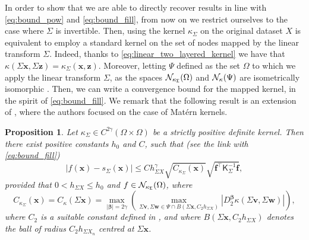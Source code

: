 \documentclass[hyphens,a4paper,11pt]{article}
\newtheorem{proposition}[theorem]{Proposition}
\newcommand{\mK}{\mathsf{K}}
\newcommand{\mSigma}{\mathsf{\Sigma}}
\begin{document}
In order to show that we are able to directly recover results in line with \eqref{eq:bound_pow} and \eqref{eq:bound_fill}, from now on we restrict ourselves to the case where $\mSigma$ is invertible. Then, using the kernel $\kappa_{\mSigma}$ on the original dataset $X$ is equivalent to employ a standard kernel on the set of nodes mapped by the linear transform $\mSigma$. Indeed, thanks to \eqref{eq:linear_two_layered_kernel} we have that $
\kappa({\mSigma}\boldsymbol{x},{\mSigma}\boldsymbol{z}) = \kappa_{\mSigma}(\boldsymbol{x},\boldsymbol{z})$. Moreover, letting $\Psi$ defined as the set $\Omega$ to which we apply the linear transform $\mSigma$, as the spaces ${\cal N}_{\kappa_{\mSigma}} (\Omega)$ and  ${\cal N}_{\kappa} (\Psi)$ are isometrically isomorphic \cite{Bozzini2015199,vskmpi}. 
Then, we can write a convergence bound for the mapped kernel, in the spirit of \eqref{eq:bound_fill}. We remark that the following result is an extension of \cite[Theorem 3.3]{Wenzel}, where the authors focused on the case of Matérn kernels.
\begin{proposition}
    Let $\kappa_{\mSigma} \in C^{2\gamma}(\Omega\times \Omega
	)$ be a strictly positive definite kernel. Then there exist positive constants $h_0$ and $C$, such that (see the link with \eqref{eq:bound_fill})
	\begin{equation*}
	| f\left(\boldsymbol{x}\right)- s_{\mSigma} \left(\boldsymbol{x}\right) |  \leq C h^{\gamma}_{ \mSigma X} \sqrt{C_{\kappa_{\mSigma}}(\boldsymbol{x})} \sqrt{\boldsymbol{f}^{\intercal}{\mK}_{\mSigma}^{-1} \boldsymbol{f}},
	\end{equation*}
	   provided that $0<h_{\mSigma X} \leq h_0$ and $f \in {\cal N}_{\kappa_{\mSigma}} (\Omega)$, 	where 
	\begin{equation*}
	C_{\kappa_{\mSigma}}(\boldsymbol{x}) = C_{\kappa}(\mSigma \boldsymbol{x}) = \max_{ |\boldsymbol{\beta} |=2\gamma} \left( \max_{\mSigma{\boldsymbol{v}},\mSigma {\boldsymbol{w}}  \in \Psi \cap B\left(\mSigma{\boldsymbol{x}},C_2h_{ \mSigma {X}}\right)} \left| D^{\boldsymbol{\beta} }_2  \kappa\left(\mSigma{\boldsymbol{v}},\mSigma{\boldsymbol{w}}\right) \right| \right),
	\end{equation*}
	where $C_2$ is a suitable constant defined in \cite[Theorem 14.4 p. 123]{fasshauer2007meshfree},  and
	where 
	$B\left(\mSigma{\boldsymbol{x}},C_2h_{ \mSigma{X}}\right)$ denotes the ball of radius $C_2h_{ \mSigma {X}_n}$ centred at $\mSigma {\boldsymbol{x}}$.
\end{proposition}
\end{document}
